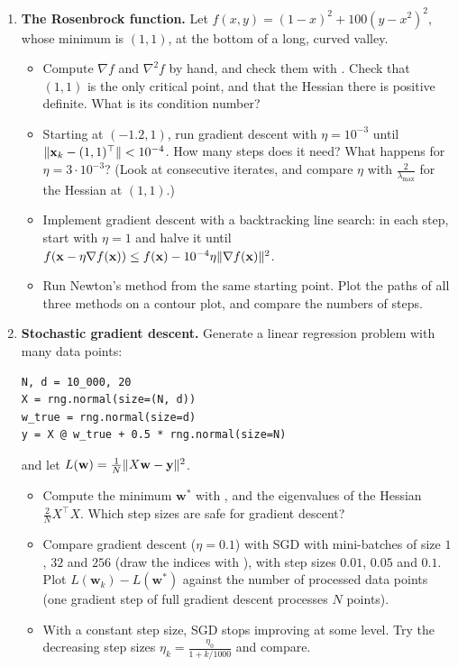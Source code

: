 \begin{enumerate}[label=\textbf{P\arabic*.}, leftmargin=*]
    \item \textbf{The Rosenbrock function.} Let $f(x, y) = (1 - x)^2 + 100(y - x^2)^2$, whose minimum is $(1, 1)$, at the bottom of a long, curved valley.
    \begin{itemize}
        \item Compute $\nabla f$ and $\nabla^2 f$ by hand, and check them with . Check that $(1, 1)$ is the only critical point, and that the Hessian there is positive definite. What is its condition number?
        \item Starting at $(-1.2, 1)$, run gradient descent with $\eta = 10^{-3}$ until $\lVert \mathbf{x}_k - (1, 1)^\top \rVert < 10^{-4}$. How many steps does it need? What happens for $\eta = 3 \cdot 10^{-3}$? (Look at consecutive iterates, and compare $\eta$ with $\frac{2}{\lambda_{\max}}$ for the Hessian at $(1, 1)$.)
        \item Implement gradient descent with a backtracking line search: in each step, start with $\eta = 1$ and halve it until $f(\mathbf{x} - \eta\nabla f(\mathbf{x})) \leq f(\mathbf{x}) - 10^{-4}\eta\lVert \nabla f(\mathbf{x}) \rVert^2$.
        \item Run Newton's method from the same starting point. Plot the paths of all three methods on a contour plot, and compare the numbers of steps.
    \end{itemize}

    \item \textbf{Stochastic gradient descent.} Generate a linear regression problem with many data points:
\begin{lstlisting}
N, d = 10_000, 20
X = rng.normal(size=(N, d))
w_true = rng.normal(size=d)
y = X @ w_true + 0.5 * rng.normal(size=N)
\end{lstlisting}
    and let $L(\mathbf{w}) = \frac{1}{N}\lVert X\mathbf{w} - \mathbf{y} \rVert^2$.
    \begin{itemize}
        \item Compute the minimum $\mathbf{w}^*$ with , and the eigenvalues of the Hessian $\frac{2}{N}X^\top X$. Which step sizes are safe for gradient descent?
        \item Compare gradient descent ($\eta = 0.1$) with SGD with mini-batches of size $1$, $32$ and $256$ (draw the indices with ), with step sizes $0.01$, $0.05$ and $0.1$. Plot $L(\mathbf{w}_k) - L(\mathbf{w}^*)$ against the number of processed data points (one gradient step of full gradient descent processes $N$ points).
        \item With a constant step size, SGD stops improving at some level. Try the decreasing step sizes $\eta_k = \frac{\eta_0}{1 + k/1000}$ and compare.
    \end{itemize}


\end{enumerate}
